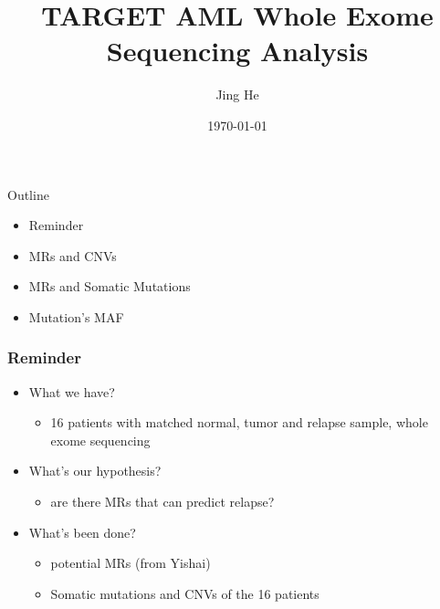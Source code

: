 \documentclass{beamer}
\title[AML WXS]{TARGET AML Whole Exome Sequencing Analysis}
\author{Jing He}
\date{\today}
\begin{document}
\begin{frame}{}
\titlepage
\end{frame}
\begin{frame}{Outline}
\begin{itemize}
		\item Reminder
		\item MRs and CNVs
		\item MRs and Somatic Mutations
		\item Mutation's MAF
\end{itemize}
\end{frame}
\begin{frame}
\frametitle{Reminder}
\begin{itemize}
	\item What we have?
	\begin{itemize}
		\item 16 patients with matched normal, tumor and relapse sample,
			whole exome sequencing
	\end{itemize}	
	\item What's our hypothesis?
	\begin{itemize}
		\item are there MRs that can predict relapse?  
	\end{itemize}
	\item What's been done?
	\begin{itemize}
		\item potential MRs (from Yishai)
		\item Somatic mutations and CNVs of the 16 patients  
	\end{itemize}
\end{itemize}
\end{frame}
\end{document}
